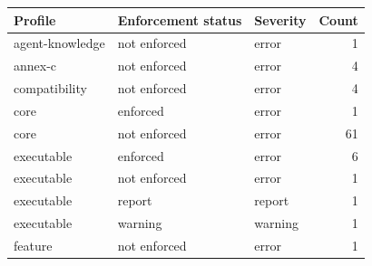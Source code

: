 \begin{tabular}{lllr}
\toprule
Profile & Enforcement status & Severity & Count \\
\midrule
agent-knowledge & not enforced & error & 1 \\
annex-c & not enforced & error & 4 \\
compatibility & not enforced & error & 4 \\
core & enforced & error & 1 \\
core & not enforced & error & 61 \\
executable & enforced & error & 6 \\
executable & not enforced & error & 1 \\
executable & report & report & 1 \\
executable & warning & warning & 1 \\
feature & not enforced & error & 1 \\
\bottomrule
\end{tabular}

